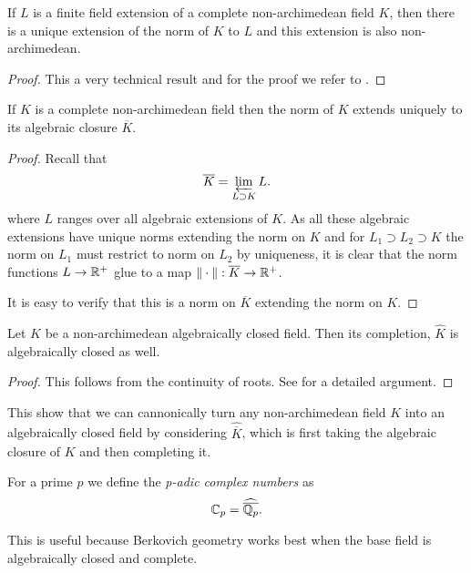\begin{theorem}\label{thm:norm_finite_field_ext}
	If $L$ is a finite field extension of a complete non-archimedean field $K$, then there is a unique extension of the norm of $K$ to $L$ and this extension is also non-archimedean.
\end{theorem}
\begin{proof}
	This a very technical result and for the proof we refer to \cite[][appendix A]{boschLecturesFormalRigid2014}. 
\end{proof}

\begin{corollary}
	If $K$ is a complete non-archimedean field then the norm of  $K$ extends uniquely to its algebraic closure $\overline{K}$.
\end{corollary}
\begin{proof}
	Recall that \[
	\overline{K} = \varprojlim_{L \supset K} L
	.\] 
	where $L$ ranges over all algebraic extensions of $K$. 
	As all these algebraic extensions have unique norms extending  the norm on $K$ and for $L_1 \supset L_2 \supset K$ the norm on  $L_1$ must restrict to norm on $L_2$ by uniqueness, it is clear that the norm functions $L \to \mathbb{R}^{+}$ glue to a map $\|\cdot \|: \overline{K} \to \mathbb{R}^{+}$. 

	It is easy to verify that this is a norm on $\overline{K}$ extending the norm on $K$. 
\end{proof}

\begin{theorem}
	Let $K$ be a non-archimedean algebraically closed field. 
	Then its completion, $\widehat K$ is algebraically closed as well. 
\end{theorem}
\begin{proof}
	This follows from the continuity of roots. See \cite[][lem A.6]{boschLecturesFormalRigid2014} for a detailed argument. 
\end{proof}

This show that we can cannonically turn any non-archimedean field $K$ into an algebraically closed field by considering $\widehat{\overline{K}}$, which is first taking the algebraic closure of $K$ and then completing it. 

\begin{definition}
	For a prime $p$ we define the \emph{p-adic complex numbers} as \[
	\mathbb{C}_p = \widehat{\overline{\mathbb{Q}_p}}
	.\] 
\end{definition}

This is useful because Berkovich geometry works best when the base field is algebraically closed and complete. 

